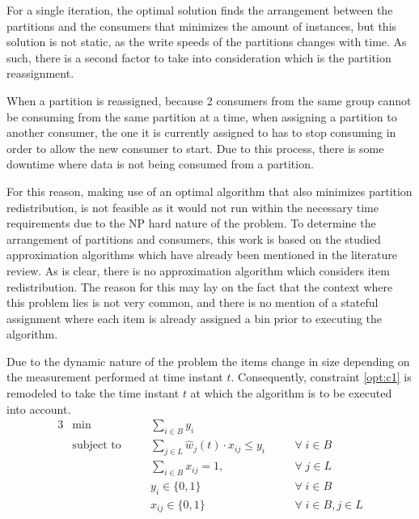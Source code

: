For a single iteration, the optimal solution finds the arrangement between the
partitions and the consumers that minimizes the amount of instances, but this
solution is not static, as the write speeds of the partitions changes with time.
As such, there is a second factor to take into consideration which is the
partition reassignment. 

When a partition is reassigned, because 2 consumers from the same group cannot
be consuming from the same partition at a time, when assigning a partition to
another consumer, the one it is currently assigned to has to stop consuming in
order to allow the new consumer to start. Due to this process, there is some
downtime where data is not being consumed from a partition.

For this reason, making use of an optimal algorithm that also minimizes
partition redistribution, is not feasible as it would not run within the
necessary time requirements due to the NP hard nature of the problem.  To
determine the arrangement of partitions and consumers, this work is based on the
studied approximation algorithms which have already been mentioned in the
literature review. As is clear, there is no approximation algorithm which
considers item redistribution. The reason for this may lay on the fact that the
context where this problem lies is not very common, and there is no mention of a
stateful assignment where each item is already assigned a bin prior to executing
the algorithm.

Due to the dynamic nature of the problem the items change in size depending on
the measurement performed at time instant $t$. Consequently, constraint
\ref{opt:c1} is remodeled to take the time instant $t$ at which the algorithm is
to be executed into account.
\begin{alignat}{3}
\label{BPP model}
    &\min       
        &&\sum_{i \in B} y_i 
            && \\
    &\text{subject to} \quad
        && \sum_{j \in L} \hat w_j(t) \cdot x_{ij} \leq y_i \quad      
            && \forall \; i \in B \\
    &   && \sum_{i \in B} x_{ij} = 1, \quad                             
            && \forall \; j \in L \\
    &   && y_i \in \{0, 1\}                                             
            && \forall \; i \in B \\
    &   && x_{ij} \in \{0,1\}                                           
            && \forall \; i \in B, j \in L
\end{alignat}

